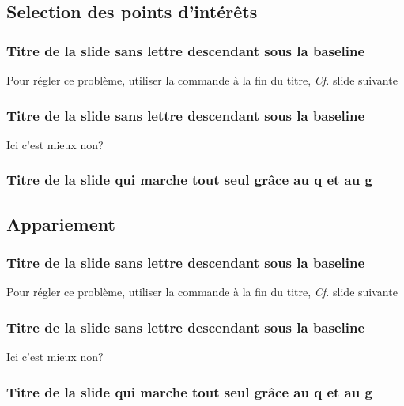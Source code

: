 \subsection{Selection des points d'intérêts}
\begin{frame}
\frametitle{Titre de la slide sans lettre descendant sous la baseline}
	Pour régler ce problème, utiliser la commande \lin{\esp} à la fin du titre, \textit{Cf.} slide suivante
\end{frame}


\begin{frame}
\frametitle{Titre de la slide sans lettre descendant sous la baseline\esp}
	Ici c'est mieux non?
\end{frame}


\begin{frame}[fragile]
\frametitle{Titre de la slide qui marche tout seul grâce au q et au g}
\end{frame}


\subsection{Appariement}
\begin{frame}
\frametitle{Titre de la slide sans lettre descendant sous la baseline}
	Pour régler ce problème, utiliser la commande \lin{\esp} à la fin du titre, \textit{Cf.} slide suivante
\end{frame}


\begin{frame}
\frametitle{Titre de la slide sans lettre descendant sous la baseline\esp}
	Ici c'est mieux non?
\end{frame}


\begin{frame}[fragile]
\frametitle{Titre de la slide qui marche tout seul grâce au q et au g}
\end{frame}
